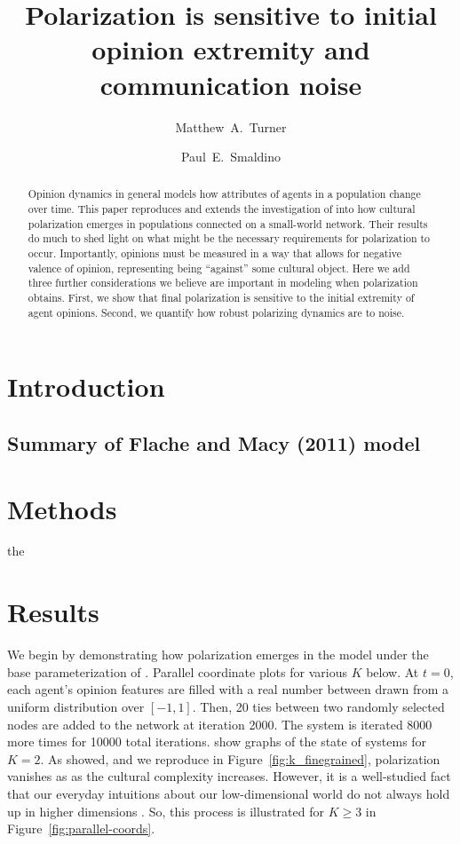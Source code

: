\documentclass[11pt,letterpaper]{article}
\title{Polarization is sensitive to initial opinion extremity and communication noise}
\author[1]{Matthew~A.~Turner}
\author[1]{Paul~E.~Smaldino}
\affil[1]{\footnotesize Cognitive Science Program, University of California, Merced}
\date{}
\begin{document}
\maketitle

\begin{abstract}
  Opinion dynamics in general models how attributes of agents in a population
  change over time. This paper reproduces and extends the investigation of
   into how cultural polarization emerges in populations
  connected on a small-world network. Their results do much to shed light
  on what might be the necessary requirements for polarization to occur.
  Importantly, opinions must be measured in a way that allows for negative
  valence of opinion, representing being ``against'' some cultural object.
  Here we add three further considerations we believe are important in 
  modeling when polarization obtains. First, we show that final polarization
  is sensitive to the initial extremity of agent opinions. Second, we quantify
  how robust polarizing dynamics are to noise. 
\end{abstract}

\section{Introduction}

\subsection{Summary of Flache and Macy (2011) model}

\section{Methods}
\label{sec:methods}

the 

\section{Results}

We begin by demonstrating how polarization emerges in the model under the
base parameterization of \cite{Flache2011}. Parallel 
coordinate plots for various $K$ below. At $t=0$, each agent's opinion 
features are filled with a real number between drawn from a uniform 
distribution over $[-1, 1]$. Then, 20 
ties between two randomly selected nodes are added to the network at 
iteration 2000. The system is iterated 8000 more times for 10000 total 
iterations.  show graphs of the state of systems for $K=2$.
As  showed, and we
reproduce in Figure~\ref{fig:k_finegrained}, polarization vanishes as
as the cultural complexity increases.
However, it is a well-studied fact that our everyday intuitions about 
our low-dimensional world do not always hold up in higher dimensions 
\cite{Aggarwal2001}. So, this process is illustrated for $K \geq 3$ in 
Figure~\ref{fig:parallel-coords}.   
\end{document}
